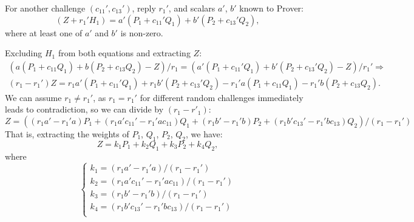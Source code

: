 \documentclass{mathcryptology} %
\theoremstyle{title}
\theoremstyle{titleof}
\renewenvironment{proof}{\noindent{\bfseries Proof:} }{}
\begin{document}
\begin{proof}
        For another challenge $\left(c_{11}', c_{13}'\right)$, reply $r_{1}'$, and scalars $a'$, $b'$ known to Prover:
        \begin{equation*}
            \left(Z+r_{1}' H_{1}\right) =a'\left(P_{1}+c_{11}' Q_{1}\right) + b'\left(P_{2}+c_{13}' Q_{2}\right),
        \end{equation*}
        where at least one of $a'$ and $b'$ is non-zero.

        Excluding $H_{1}$ from both equations and extracting $Z$:
        \begin{gather*}
            \left( a \left(P_{1} + c_{11} Q_{1}\right) + b\left( P_{2} + c_{13} Q_{2}\right) -Z\right)/r_{1}
                =\left(a'\left(P_{1}+c_{11}' Q_{1}\right) + b'\left( P_{2} + c_{13}' Q_{2}\right) -Z\right)/r_{1}' \Rightarrow \\
            \left(r_{1}-r_{1}' \right) Z
                = r_{1} a'\left(P_{1} + c_{11}' Q_{1}\right) + r_{1} b'\left(P_{2} + c_{13}' Q_{2}\right)-r_{1}' a\left(P_{1}
                    +c_{11} Q_{1}\right)-r_{1}' b\left( P_{2}+c_{13} Q_{2}\right).
        \end{gather*}
        We can assume $r_{1} \neq r_{1}'$, as $r_{1} = r_{1}'$ for different random challenges immediately leads to contradiction, so we can divide by $(r_{1}-r'_{1})$:
        \begin{equation*}
            Z = \left(\left(r_{1} a' - r_{1}' a\right) P_{1} + \left(r_{1} a' c_{11}' - r_{1}' ac_{11}\right) Q_{1} +
                \left(r_{1}b'  - r_{1}' b\right) P_{2} +
                \left(r_{1} b' c_{13}' - r_{1}' b c_{13}\right) Q_{2}\right) / \left(r_{1} - r_{1}'\right)
        \end{equation*}        
        That is, extracting the weights of $P_{1}$, $Q_{1}$, $P_{2}$, $Q_{2}$, we have:
        \begin{equation*}
        	Z=k_{1}P_{1}+k_{2}Q_{1}+k_{3}P_{2}+k_{4}Q_{2},
        \end{equation*}
        where
        \begin{equation*}
            \left\{
            \begin{array}{l}
                k_{1} = \left(r_{1} a' - r_{1}' a\right)                /\left(r_{1} - r_{1}'\right)\\
                k_{2} = \left(r_{1} a' c_{11}' - r_{1}' a c_{11}\right) /\left(r_{1} - r_{1}'\right)\\
                k_{3} = \left(r_{1} b'  - r_{1}' b \right) /\left(r_{1} - r_{1}'\right)\\
                k_{4} = \left(r_{1} b' c_{13}' - r_{1}' b c_{13}\right)   /\left(r_{1} - r_{1}'\right)\\
            \end{array}\right.
        \end{equation*}
        

\end{proof}
\end{document}
